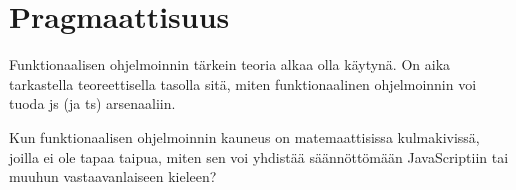 















\section{Pragmaattisuus}

Funktionaalisen ohjelmoinnin tärkein teoria alkaa olla käytynä. On aika tarkastella teoreettisella tasolla sitä, miten funktionaalinen ohjelmoinnin voi tuoda \gls{js} (ja \gls{ts}) arsenaaliin.

Kun funktionaalisen ohjelmoinnin kauneus on matemaattisissa kulmakivissä, joilla ei ole tapaa taipua, miten sen voi yhdistää säännöttömään JavaScriptiin tai muuhun vastaavanlaiseen kieleen?

